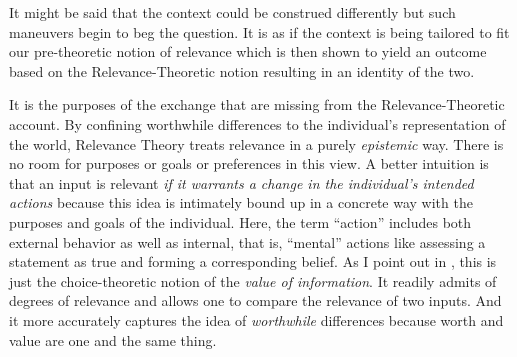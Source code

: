
It might be said that the context could be construed differently but such maneuvers begin to beg the question. It is as if the context is being tailored to fit our pre-theoretic notion of relevance which is then shown to yield an outcome based on the Relevance-Theoretic notion resulting in an identity of the two.


It is the purposes of the exchange that are missing from the Relevance-Theo\-retic account. By confining worthwhile differences to the individual's representation of the world, Relevance Theory treats relevance in a purely \emph{epistemic} way. There is no room for purposes or goals or preferences in this view. A better intuition is that an input is relevant \emph{if it warrants a change in the individual's intended actions} because this idea is intimately bound up in a concrete way with the purposes and goals of the individual. Here, the term ``action'' includes both external behavior as well as internal, that is, ``mental'' actions like assessing a statement as true and forming a corresponding belief. As I point out in \citet{parikh:gtai, parikh:rs, parikh:le}, this is just the choice-theoretic notion of the \emph{value of information}. It readily admits of degrees of relevance and allows one to compare the relevance of two inputs. And it more accurately captures the idea of \emph{worthwhile} differences because worth and value are one and the same thing.

